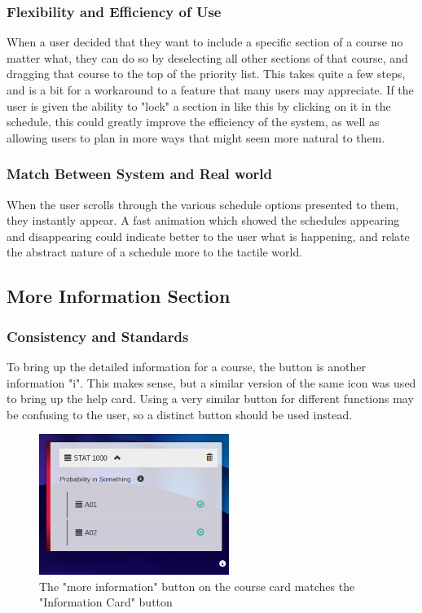 \documentclass{article}
\begin{document}
\subsubsection{Flexibility and Efficiency of Use}
When a user decided that they want to include a specific section of a course no matter what, they can do so by deselecting all other sections of that course, and dragging that course to the top of the priority list. This takes quite a few steps, and is a bit for a workaround to a feature that many users may appreciate. If the user is given the ability to "lock" a section in like this by clicking on it in the schedule, this could greatly improve the efficiency of the system, as well as allowing users to plan in more ways that might seem more natural to them.


\subsubsection{Match Between System and Real world}
When the user scrolls through the various schedule options presented to them, they instantly appear. A fast animation which showed the schedules appearing and disappearing could indicate better to the user what is happening, and relate the abstract nature of a schedule more to the tactile world.




\subsection{More Information Section}




\subsubsection{Consistency and Standards}
To bring up the detailed information for a course, the button is another information "i". This makes sense, but a similar version of the same icon was used to bring up the help card. Using a very similar button for different functions may be confusing to the user, so a distinct button should be used instead. 

\begin{figure}[h!]
    \centering
    \includegraphics[width=0.55\textwidth]{moreInfo.png}

    \caption{The "more information" button on the course card matches the "Information Card" button}
    \label{fig:moreInfo}
\end{figure}
\end{document}
